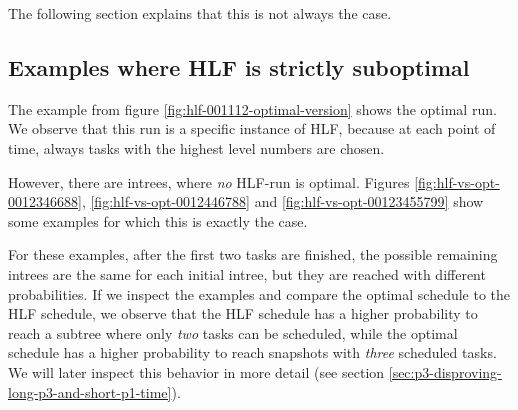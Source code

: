 The following section explains that this is not always the case.

\subsection{Examples where HLF is strictly suboptimal}
\label{sec:p3-suboptimal-hlf-strictly-suboptimal}

The example from figure \ref{fig:hlf-001112-optimal-version} shows the optimal run. We observe that this run is a specific instance of HLF, because at each point of time, always tasks with the highest level numbers are chosen.

However, there are intrees, where \emph{no} HLF-run is optimal. Figures \ref{fig:hlf-vs-opt-0012346688}, \ref{fig:hlf-vs-opt-0012446788} and \ref{fig:hlf-vs-opt-00123455799} show some examples for which this is exactly the case.

For these examples, after the first two tasks are finished, the possible remaining intrees are the same for each initial intree, but they are reached with different probabilities. If we inspect the examples and compare the optimal schedule to the HLF schedule, we observe that the HLF schedule has a higher probability to reach a subtree where only \emph{two} tasks can be scheduled, while the optimal schedule has a higher probability to reach snapshots with \emph{three} scheduled tasks. We will later inspect this behavior in more detail (see section \ref{sec:p3-disproving-long-p3-and-short-p1-time}).

